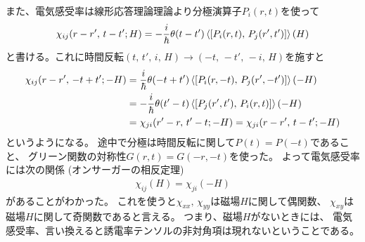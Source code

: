 \documentclass[9pt,dvipdfmx,a4paper]{jsarticle}
\begin{document}
また、電気感受率は線形応答理論理論より分極演算子\(P_i(r,t)\)を使って
\begin{align}
    \chi_{ij}(r-r',\,t-t';H) = -\frac{i}{\hbar}\theta(t-t')\ev{\left[P_i(r,t),\,P_j(r',t')\right]}(H)
\end{align}
と書ける。これに時間反転\((t,\,t',\,i,\,H)\rightarrow(-t,\,-t',\,-i,\,H)\)を施すと
\begin{align}
    \chi_{ij}(r-r',\,-t+t';-H)
    &= \frac{i}{\hbar}\theta(-t+t')\ev{\left[P_i(r,-t),\,P_j(r',-t')\right]}(-H)\notag\\
    &= -\frac{i}{\hbar}\theta(t'-t)\ev{\left[P_j(r',t'),\,P_i(r,t)\right]}(-H)\notag\\
    &= \chi_{ji}(r'-r,\,t'-t;-H) = \chi_{ji}(r-r',\,t-t';-H)
\end{align}
というようになる。
途中で分極は時間反転に関して\(P(t)=P(-t)\)であること、
グリーン関数の対称性\(G(r,t)=G(-r,-t)\)を使った。
よって電気感受率には次の関係 (オンサーガーの相反定理)
\begin{align}
    \chi_{ij}(H) = \chi_{ji}(-H)
\end{align}
があることがわかった。
これを使うと\(\chi_{xx},\,\chi_{yy}\)は磁場\(H\)に関して偶関数、
\(\chi_{xy}\)は磁場\(H\)に関して奇関数であると言える。
つまり、磁場\(H\)がないときには、
電気感受率、言い換えると誘電率テンソルの非対角項は現れないということである。
\end{document}
